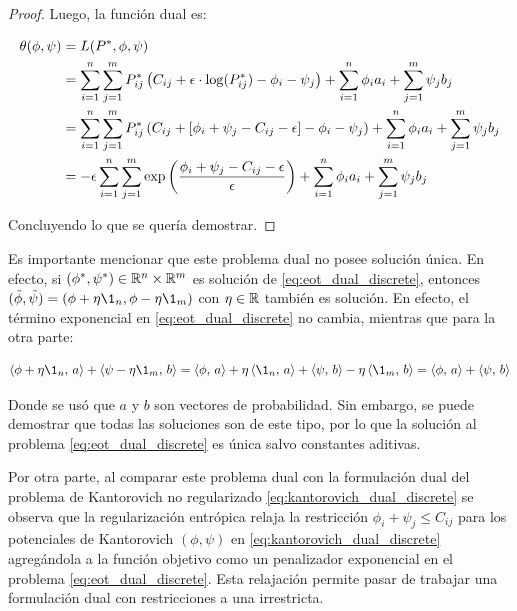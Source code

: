 \begin{proof}
	Luego, la función dual es:

	\begin{align*}
		\theta(\phi,\psi) & = L(P^*,\phi,\psi)\\
		                  & = \sum_{i=1}^n\sum_{j=1}^m P_{ij}^* \left( C_{ij} + \epsilon\cdot\log(P_{ij}^*)- \phi_i-\psi_j \right) + \sum_{i=1}^n \phi_i a_i + \sum_{j=1}^m \psi_j b_j\\
		                  & = \sum_{i=1}^n\sum_{j=1}^m P_{ij}^* \left( C_{ij} + [\phi_i+\psi_j-C_{ij}-\epsilon] - \phi_i-\psi_j \right) + \sum_{i=1}^n \phi_i a_i + \sum_{j=1}^m \psi_j b_j\\
		                  & = -\epsilon \sum_{i=1}^n\sum_{j=1}^m \exp\left(\frac{\phi_i + \psi_j-C_{ij} - \epsilon}{\epsilon}\right) + \sum_{i=1}^n \phi_i a_i + \sum_{j=1}^m \psi_j b_j
	\end{align*}

	Concluyendo lo que se quería demostrar.
\end{proof}

Es importante mencionar que este problema dual no posee solución única. En efecto, si $(\phi^*,\psi^*)\in\mathbb{R}^n\times\mathbb{R}^m$ es solución de \eqref{eq:eot_dual_discrete}, entonces $(\tilde{\phi},\tilde{\psi}) = (\phi + \eta\1_n, \phi - \eta\1_m)$ con $\eta\in\mathbb{R}$ también es solución. En efecto, el término exponencial en \eqref{eq:eot_dual_discrete} no cambia, mientras que para la otra parte:

\begin{equation*}
	\dotproduct{\phi + \eta\1_n}{a} + \dotproduct{\psi - \eta\1_m}{b}
	= \dotproduct{\phi}{a} + \eta\dotproduct{\1_n}{a} + \dotproduct{\psi}{b} - \eta\dotproduct{\1_m}{b}
	= \dotproduct{\phi}{a} + \dotproduct{\psi}{b}
\end{equation*}

Donde se usó que $a$ y $b$ son vectores de probabilidad. Sin embargo, se puede demostrar que todas las soluciones son de este tipo, por lo que la solución al problema \eqref{eq:eot_dual_discrete} es única salvo constantes aditivas.

Por otra parte, al comparar este problema dual con la formulación dual del problema de Kantorovich no regularizado \eqref{eq:kantorovich_dual_discrete} se observa que la regularización entrópica relaja la restricción $\phi_i+\psi_j \leq C_{ij}$ para los potenciales de Kantorovich $(\phi,\psi)$ en \eqref{eq:kantorovich_dual_discrete} agregándola a la función objetivo como un penalizador exponencial en el problema \eqref{eq:eot_dual_discrete}. Esta relajación permite pasar de trabajar una formulación dual con restricciones a una irrestricta.

